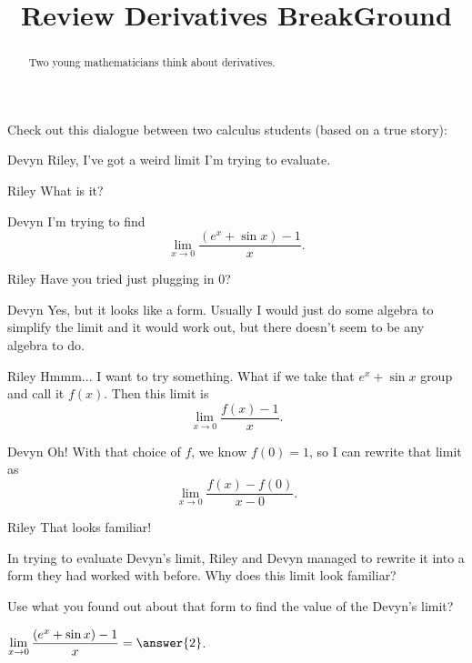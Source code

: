\documentclass{ximera}
\title[Break-Ground:]{Review Derivatives BreakGround}
\begin{document}
\begin{abstract}
  Two young mathematicians think about derivatives.
\end{abstract}
\maketitle

Check out this dialogue between two calculus students (based on a true
story):

\begin{dialogue}
\item[Devyn] Riley, I've got a weird limit I'm trying to evaluate.
\item[Riley] What is it?
\item[Devyn] I'm trying to find \[ \lim_{x \to 0} \frac{(e^x + \sin x) - 1}{x}.\]
\item[Riley] Have you tried just plugging in $0$?
\item[Devyn] Yes, but it looks like a \zeroOverZero form.  Usually I would just do some algebra to simplify the limit and it would work out,
		but there doesn't seem to be any algebra to do.
\item[Riley] Hmmm... I want to try something.  What if we take that $e^x + \sin x$ group and call it $f(x)$.  Then this limit is
		\[ \lim_{x \to 0} \frac{f(x) - 1}{x}.\]
\item[Devyn] Oh!  With that choice of $f$, we know $f(0) = 1$, so I can rewrite that limit as
		\[ \lim_{x \to 0} \frac{f(x) - f(0)}{x-0}.\]
\item[Riley] That looks familiar!
\end{dialogue}

\begin{problem}
 In trying to evaluate Devyn's limit, Riley and Devyn managed to rewrite it into a form they had worked with before.  Why does this limit look familiar?
  \begin{multipleChoice}
  \end{multipleChoice}
\end{problem}

\begin{problem}
Use what you found out about that form to find the value of the Devyn's limit?
	\begin{prompt}
		$\displaystyle \lim_{x \to 0} \frac{(e^x + \sin x) - 1}{x} = \answer{2}$.
	\end{prompt}
\end{problem}



\end{document}
